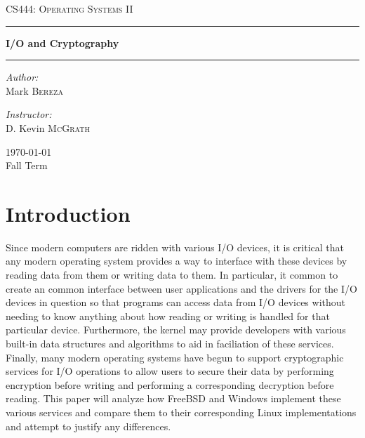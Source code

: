 \documentclass[onecolumn, draftclsnofoot,10pt, compsoc]{IEEEtran}
\begin{document}
\begin{titlepage}
\begin{center}

\vspace*{50mm}

\textsc{\LARGE CS444: Operating Systems II}\\[1.5cm]

\hrule
\vspace{5mm}
{ \huge \bfseries I/O and Cryptography \\[0.9cm] }
\hrule 
\vspace{5mm}

\noindent
\begin{minipage}{0.4\textwidth}

\begin{flushleft} \large
\emph{Author:}\\
Mark \textsc{Bereza}
\end{flushleft}
\end{minipage}%
\begin{minipage}{0.4\textwidth}
\begin{flushright} \large
\emph{Instructor:} \\
D. Kevin \textsc{McGrath}
\end{flushright}

\end{minipage}

\vspace*{\fill}
{\large \today}\\
{\large Fall Term}

\end{center}
\end{titlepage}
  
\tableofcontents
\newpage
\renewcommand{\baselinestretch}{1.0}
\linespread{1.0}
\section{Introduction}
Since modern computers are ridden with various I/O devices, it is critical that any modern operating system provides a way to interface with these devices by reading data from them or writing data to them. In particular, it common to create an common interface between user applications and the drivers for the I/O devices in question so that programs can access data from I/O devices without needing to know anything about how reading or writing is handled for that particular device. Furthermore, the kernel may provide developers with various built-in data structures and algorithms to aid in faciliation of these services. Finally, many modern operating systems have begun to support cryptographic services for I/O operations to allow users to secure their data by performing encryption before writing and performing a corresponding decryption before reading. This paper will analyze how FreeBSD and Windows implement these various services and compare them to their corresponding Linux implementations and attempt to justify any differences.
\end{document}
